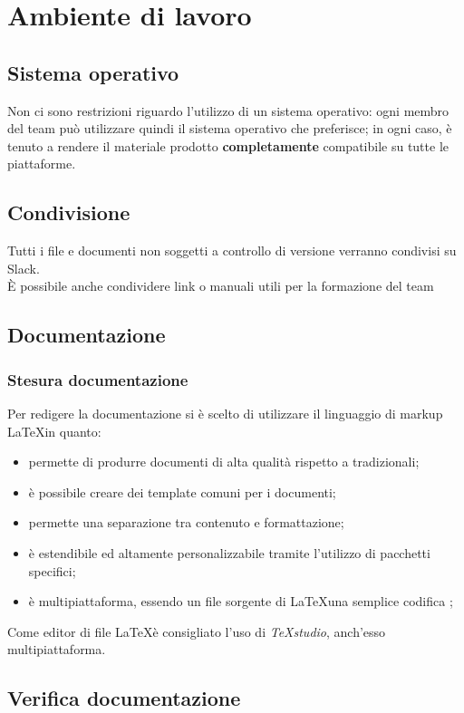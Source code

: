\section{Ambiente di lavoro}
	\subsection{Sistema operativo}
	Non ci sono restrizioni riguardo l'utilizzo di un sistema operativo: ogni membro del team può utilizzare quindi il sistema operativo che preferisce; in ogni caso, è tenuto a rendere il materiale prodotto \textbf{completamente} compatibile su tutte le piattaforme.
	\subsection{Condivisione}
	Tutti i file e documenti non soggetti a controllo di versione verranno condivisi su Slack. \\
	È possibile anche condividere link o manuali utili per la formazione del team
	\subsection{Documentazione}
	\subsubsection{Stesura documentazione}
	Per redigere la documentazione si è scelto di utilizzare il linguaggio di markup \LaTeX in quanto: \\
	\begin{itemize} 
	\item permette di produrre documenti di alta qualità rispetto a  tradizionali; 
	\item è possibile creare dei template comuni per i documenti;
	\item permette una separazione tra contenuto e formattazione;
	\item è estendibile ed altamente personalizzabile tramite l'utilizzo di pacchetti specifici;
	\item è multipiattaforma, essendo un file sorgente di \LaTeX una semplice codifica ;
	\end{itemize}
	Come editor di file \LaTeX è consigliato l'uso di \textit{TeXstudio}, anch'esso multipiattaforma.
	\subsection{Verifica documentazione}
	